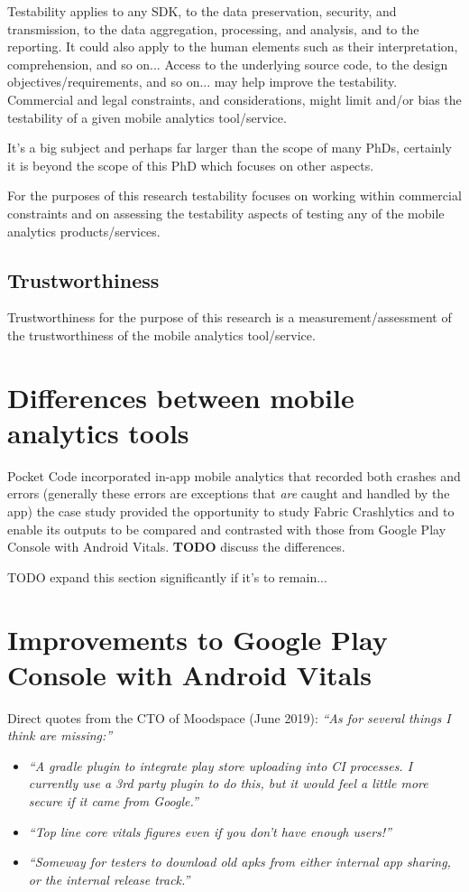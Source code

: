 Testability applies to any SDK, to the data preservation, security, and transmission, to the data aggregation, processing, and analysis, and to the reporting. It could also apply to the human elements such as their interpretation, comprehension, and so on... Access to the underlying source code, to the design objectives/requirements, and so on... may help improve the testability. Commercial and legal constraints, and considerations, might limit and/or bias the testability of a given mobile analytics tool/service.

It's a big subject and perhaps far larger than the scope of many PhDs, certainly it is beyond the scope of this PhD which focuses on other aspects. 

For the purposes of this research testability focuses on working within commercial constraints and on assessing the testability aspects of testing any of the mobile analytics products/services.


\subsection{Trustworthiness}
Trustworthiness for the purpose of this research is a measurement/assessment of the trustworthiness of the mobile analytics tool/service.


\section{Differences between mobile analytics tools}
Pocket Code incorporated in-app mobile analytics that recorded both crashes and errors (generally these errors are exceptions that \textit{are} caught and handled by the app) the case study provided the opportunity to study Fabric Crashlytics and to enable its outputs to be compared and contrasted with those from Google Play Console with Android Vitals. \textbf{TODO} discuss the differences.

TODO expand this section significantly if it's to remain...

\section{Improvements to Google Play Console with Android Vitals}

Direct quotes from the CTO of Moodspace (June 2019): \emph{``As for several things I think are missing:''}
\begin{itemize}
    \item \textit{``A gradle plugin to integrate play store uploading into CI processes. I currently use a 3rd party plugin to do this, but it would feel a little more secure if it came from Google.''}
    \item \textit{``Top line core vitals figures even if you don't have enough users!''}
    \item \textit{``Someway for testers to download old apks from either internal app sharing, or the internal release track.''}
\end{itemize}

